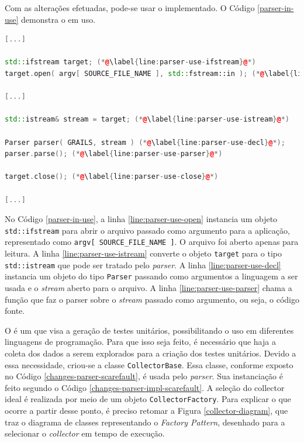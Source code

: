 Com as alterações efetuadas, pode-se usar o \parser implementado. O Código
\ref{parser-in-use} demonstra o \parser em uso.

\begin{lstlisting}[language=C++, label=parser-in-use, caption=\textit{Parser} em uso]
[...]

std::ifstream target; (*@\label{line:parser-use-ifstream}@*)
target.open( argv[ SOURCE_FILE_NAME ], std::fstream::in ); (*@\label{line:parser-use-open}@*)

[...]

std::istream& stream = target; (*@\label{line:parser-use-istream}@*)

Parser parser( GRAILS, stream ) (*@\label{line:parser-use-decl}@*);
parser.parse(); (*@\label{line:parser-use-parser}@*)

target.close(); (*@\label{line:parser-use-close}@*)

[...]
\end{lstlisting}

No Código \ref{parser-in-use}, a linha \ref{line:parser-use-open} instancia um
objeto \lstinline|std::ifstream| para abrir o arquivo passado como argumento para
a aplicação, representado como \lstinline|argv[ SOURCE_FILE_NAME ]|. O arquivo foi
aberto apenas para leitura. A linha \ref{line:parser-use-istream} converte o
objeto \lstinline|target| para o tipo \lstinline|std::istream| que pode ser tratado
pelo \textit{parser}. A linha \ref{line:parser-use-decl} instancia um objeto do
tipo \lstinline|Parser| passando como argumentos a linguagem a ser usada e o
\textit{stream} aberto para o arquivo. A linha \ref{line:parser-use-parser} chama
a função que faz o {parser} sobre o \textit{stream} passado como argumento, ou seja,
o código fonte.

O \scarefault é um \framework que visa a geração de testes unitários, possibilitando
o uso em diferentes linguagens de programação. Para que isso seja feito, é necessário
que haja a coleta dos dados a serem explorados para a criação dos testes unitários.
Devido a essa necessidade, criou-se a classe \lstinline|CollectorBase|. Essa classe,
conforme exposto no Código \ref{changes-parser-scarefault}, é usada pelo \textit{parser}.
Sua instanciação é feito segundo o Código \ref{changes-parser-impl-scarefault}. A seleção do \textsf{collector} ideal é realizada por meio de um objeto \lstinline|CollectorFactory|. Para explicar o que ocorre a partir desse ponto, é preciso retomar a Figura
\ref{collector-diagram}, que traz o diagrama de classes representando o
\textit{Factory Pattern}, desenhado para a selecionar o \textit{collector} em tempo
de execução.

